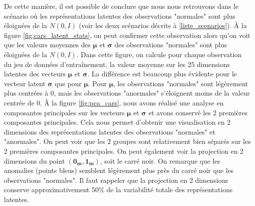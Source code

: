 De cette manière, il est possible de conclure que nous nous retrouvons dans le scénario où les représentations latentes des observations "normales" sont plus éloignées de la $N(0,I)$ (voir les deux scénarios décrits à \ref{liste_scenarios}). À la figure \ref{fig:cars_latent_stats}, on peut confirmer cette observation alors qu'on voit que les valeurs moyennes des $\boldsymbol{\mu}$ et $\boldsymbol{\sigma}$ des observations "normales" sont plus éloignées de la $N(0,I)$. Dans cette figure, on calcule pour chaque observation du jeu de données d'entraînement, la valeur moyenne sur les 25 dimensions latentes des vecteurs $\boldsymbol{\mu}$ et $\boldsymbol{\sigma}$. La différence est beaucoup plus évidente pour le vecteur latent $\boldsymbol{\sigma}$ que pour $\boldsymbol{\mu}$. Pour $\boldsymbol{\mu}$, les observations "normales" sont légèrement plus centrées à 0, mais les observations "anormales" s'éloignent moins de la valeur centrée de 0. À la figure \ref{fig:pca_cars}, nous avons réalisé une analyse en composantes principales sur les vecteurs $\boldsymbol{\mu}$ et $\boldsymbol{\sigma}$ et avons conservé les 2 premières composantes principales. Cela nous permet d'obtenir une visualisation en 2 dimensions des représentations latentes des observations "normales" et "anormales". On peut voir que les 2 groupes sont relativement bien séparés sur les 2 premières composantes principales. On peut également voir la projection en 2 dimensions du point $(\boldsymbol{0_{m}}, \boldsymbol{1_{m}})$, soit le carré noir. On remarque que les anomalies (points bleus) semblent légèrement plus près du carré noir que les observations "normales". Il faut rappeler que la projection en 2 dimensions conserve approximativement 50\% de la variabilité totale des représentations latentes.

